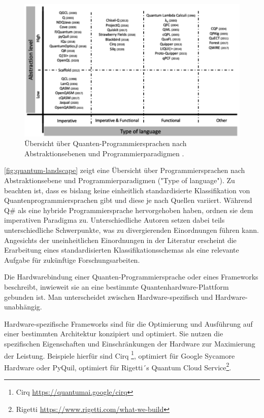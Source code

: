 \begin{figure}[ht!]
    \centering
    \includegraphics[width=0.9\linewidth]{images/languages/Quantum-Programming-Landscape.png}
    \caption{Übersicht über Quanten-Programmiersprachen nach Abstraktionsebenen und Programmierparadigmen \autocite[][]{serrano_quantum_2023}.}
    \label{fig:quantum-landscape}
\end{figure}

\autoref{fig:quantum-landscape} zeigt eine Übersicht über Programmiersprachen nach Abstraktionsebene und Programmierparadigmen ("Type of language"). Zu beachten ist, dass es bislang keine einheitlich standardisierte Klassifikation von Quantenprogrammiersprachen gibt und diese je nach Quellen variiert. Während \citeauthor{garhwal_quantum_2021} Q\# als eine hybride Programmiersprache hervorgehoben haben, ordnen \citeauthor{serrano_quantum_2023} sie dem imperativen Paradigma zu. 
Unterschiedliche Autoren setzen dabei teils unterschiedliche Schwerpunkte, was zu divergierenden Einordnungen führen kann. Angesichts der uneinheitlichen Einordnungen in der Literatur erscheint die Erarbeitung eines standardisierten Klassifikationsschemas als eine relevante Aufgabe für zukünftige Forschungsarbeiten.

\begin{defn}[Hardwarebindung]
\label{def:hardware-binding}
Die Hardwarebindung einer Quanten-Pro\-gram\-mier\-sprache oder eines Frameworks beschreibt, inwieweit sie an eine bestimmte Quanten\-hardware-Plattform gebunden ist. Man unterscheidet zwischen Hardware-spezifisch und Hardware-unabhängig.
\end{defn}

\begin{defn}
Hardware-spezifische Frameworks sind für die Optimierung und Ausführung auf einer bestimmten Architektur konzipiert und optimiert. Sie nutzen die spezifischen Eigenschaften und Einschränkungen der Hardware zur Maximierung der Leistung. Beispiele hierfür sind Cirq \footnote{Cirq \url{https://quantumai.google/cirq}}, optimiert für Google Sycamore Hardware oder PyQuil, optimiert für Rigetti´s Quantum Cloud Service\footnote{Rigetti \url{https://www.rigetti.com/what-we-build}}. 
\end{defn}

